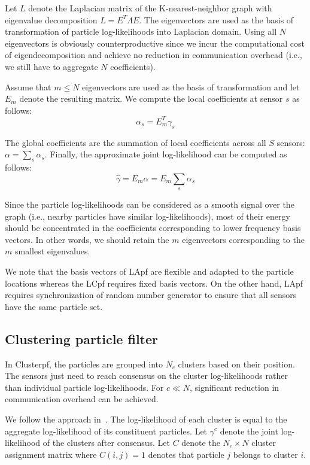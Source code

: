 \documentclass[10pt,letterpaper,final]{article}
\begin{document}
Let $L$ denote the Laplacian matrix of the K-nearest-neighbor graph with eigenvalue decomposition $L=E^T\Lambda E$. The eigenvectors are used as the basis of transformation of particle log-likelihoods into Laplacian domain. Using all $N$ eigenvectors is obviously counterproductive since we incur the computational cost of eigendecomposition and achieve no reduction in communication overhead (i.e., we still have to aggregate $N$ coefficients). 

Assume that $m\leq N$ eigenvectors are used as the basis of transformation and let $E_m$ denote the resulting matrix. We compute the local coefficients at sensor $s$ as follows:
\begin{equation}
\alpha_s = E_m^T\gamma_s
\end{equation}

The global coefficients are the summation of local coefficients across all $S$ sensors: $\alpha = \sum_s \alpha_s$. Finally, the approximate joint log-likelihood can be computed as follows:
\begin{equation}
\hat{\gamma} = E_m\alpha = E_m \sum_s \alpha_s
\end{equation}

Since the particle log-likelihoods can be considered as a smooth signal over the graph (i.e., nearby particles have similar log-likelihoods), most of their energy should be concentrated in the coefficients corresponding to lower frequency basis vectors. In other words, we should retain the $m$ eigenvectors corresponding to the $m$ smallest eigenvalues. 

We note that the basis vectors of LApf are flexible and adapted to the particle locations whereas the LCpf requires fixed basis vectors. On the other hand, LApf requires synchronization of random number generator to ensure that all sensors have the same particle set. 

\subsection{Clustering particle filter}
\label{sec:evaluation}
In Clusterpf, the particles are grouped into $N_c$ clusters based on their position. The sensors just need to reach consensus on the cluster log-likelihoods rather than individual particle log-likelihoods. For $c \ll N$, significant reduction in communication overhead can be achieved. 

We follow the approach in~\cite{}. The log-likelihood of each cluster is equal to the aggregate log-likelihood of its constituent particles. Let $\gamma^c$ denote the joint log-likelihood of the clusters after consensus. Let $C$ denote the $N_c \times N$ cluster assignment matrix where $C(i,j)=1$ denotes that particle $j$ belongs to cluster $i$. 
\end{document}
